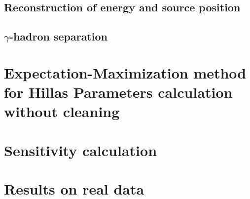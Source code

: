 \documentclass[main.tex]{subfiles}
\begin{document}
\subsection{Reconstruction of energy and source position}

\subsection{$\gamma$-hadron separation}

\section[Expectation-Maximization method for Hillas Parameters...]{Expectation-Maximization method for Hillas Parameters calculation without cleaning}
\section{Sensitivity calculation}
\section{Results on real data}
\end{document}
